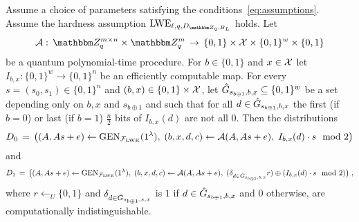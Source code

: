 \begin{lemma}\label{lem:lweadaptiveleakage}
Assume a choice of parameters satisfying the conditions~\eqref{eq:assumptions}. Assume the hardness assumption $\lwe_{\ell,q,D_{\mZ_q,B_L}}$ holds. Let
$$\mathcal{A}:\, \mZ_q^{m\times n} \times \mZ_q^m \,\to\,\{0,1\}\times \sX \times \{0,1\}^w \times\{0,1\}$$
be a quantum polynomial-time procedure. For $b\in\{0,1\}$ and $x\in\mathcal{X}$ let $I_{b,x}:\{0,1\}^w \to \{0,1\}^n$ be an efficiently computable map. For every $s = (s_0,s_1)\in\{0,1\}^n$ and $(b,x)\in\{0,1\}\times\mathcal{X}$, let $\hat{G}_{s_{b\oplus 1},b,x}\subseteq \{0,1\}^w$ be a set depending only on $b,x$ and $s_{b\oplus 1}$ and such that for all $d\in \hat{G}_{s_{b\oplus 1},b,x}$ the first (if $b=0$) or last (if $b=1$) $\frac{n}{2}$ bits of $I_{b,x}(d)$ are not all $0$.
 Then the distributions
\begin{eqnarray}\label{eq:l14-1}
{D}_0 \,=\, \big( (\*A,\*A\*s+\*e) \leftarrow \textrm{GEN}_{\mathcal{F}_{\lwe}}(1^{\lambda}) ,\; (b,x,d,c) \leftarrow \mathcal{A}(\*A,\*A\*s+\*e),\; I_{b,x}(d) \cdot s \mod 2\big) 
\end{eqnarray}
and
\begin{eqnarray}\label{eq:l14-2}
{D}_1 \,=\, \big( (\*A,\*A\*s+\*e) \leftarrow \textrm{GEN}_{\mathcal{F}_{\lwe}}(1^{\lambda}) ,\;(b,x,d,c) \leftarrow \mathcal{A}(\*A,\*A\*s+\*e), \; (\delta_{d\in \hat{\dset}_{s_{b\oplus 1},b,x}} r) \oplus (I_{b,x}(d) \cdot s\mod 2) \big)\;, 
\end{eqnarray}
where $r\leftarrow_U \{0,1\}$ and $\delta_{d\in \hat{G}_{s_{b\oplus 1},s,x}}$ is $1$ if $d\in \hat{G}_{s_{b\oplus 1},b,x}$ and $0$ otherwise, are computationally indistinguishable. 
\end{lemma}

